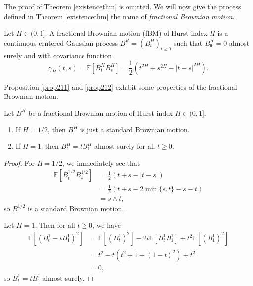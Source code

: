 The proof of Theorem \ref{existencethm} is omitted. 
We will now give the process defined in Theorem \ref{existencethm} the name of \textit{fractional Brownian motion}.%
\begin{defn}
    Let $H\in (0,1]$. A fractional Brownian motion (fBM) of Hurst index $H$ is a continuous centered Gaussian process $B^{H}=(B_{t}^{H})_{t\geq 0}$ such that $B_{0}^{H}=0$ almost surely and with covariance function
    \begin{equation}
        \gamma_{H}(t,s)=\mathbb{E}[B_{t}^{H}B_{s}^{H}]=\frac{1}{2}\left(t^{2H}+s^{2H}-|t-s|^{2H}\right).
    \end{equation}
\end{defn}
Proposition \ref{prop211} and \ref{prop212} exhibit some properties of the fractional Brownian motion.
\begin{prop}\label{prop211}
    Let $B^{H}$ be a fractional Brownian motion of Hurst index $H\in (0,1]$.
    \begin{enumerate}
        \item If $H=1/2$, then $B^{H}$ is just a standard Brownian motion.
        \item If $H=1$, then $B^{H}_{t}=tB_{1}^{H}$ almost surely for all $t\geq 0$.
    \end{enumerate}
\end{prop}
\begin{proof}
    For $H=1/2$, we immediately see that
    \begin{align}
        \mathbb{E}[B_{t}^{1/2}B_{s}^{1/2}]&=\frac{1}{2}\left(t+s-|t-s|\right)\\
        &= \frac{1}{2}\left(t+s-2 \min\{s,t\}-s-t\right)\\
        &= s\land t,
    \end{align}
    so $B^{1/2}$ is a standard Brownian motion.

    Let $H=1$. Then for all $t\geq 0$, we have
    \begin{align}
        \mathbb{E}\left[(B^{1}_{t}-tB_{1}^{1})^{2}\right]&= \mathbb{E}\left[(B_{t}^{1})^{2}\right]-2t\mathbb{E}\left[B_{t}^{1}B_{1}^{1}\right]+t^{2}\mathbb{E}\left[(B_{1}^{1})^{2}\right]\\
        &= t^{2}-t\left(t^{2}+1-(1-t)^{2}\right)+t^{2}\\
        &= 0,
    \end{align}
    so $B_{t}^{1}=tB_{1}^{1}$ almost surely.
\end{proof}

